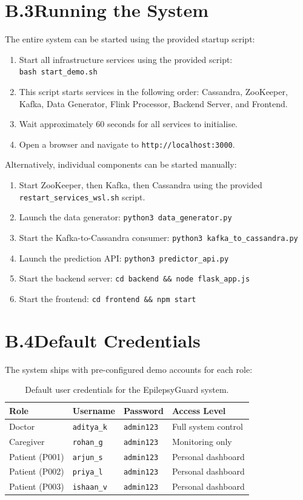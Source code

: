 \documentclass[12pt, a4paper, oneside]{report}
\begin{document}
\section*{B.3\quad Running the System}
The entire system can be started using the provided startup script:
\begin{enumerate}
    \item Start all infrastructure services using the provided script: \\
    \texttt{bash start\_demo.sh}
    \item This script starts services in the following order: Cassandra, ZooKeeper, Kafka, Data Generator, Flink Processor, Backend Server, and Frontend.
    \item Wait approximately 60 seconds for all services to initialise.
    \item Open a browser and navigate to \texttt{http://localhost:3000}.
\end{enumerate}

Alternatively, individual components can be started manually:
\begin{enumerate}
    \item Start ZooKeeper, then Kafka, then Cassandra using the provided \texttt{restart\_services\_wsl.sh} script.
    \item Launch the data generator: \texttt{python3 data\_generator.py}
    \item Start the Kafka-to-Cassandra consumer: \texttt{python3 kafka\_to\_cassandra.py}
    \item Launch the prediction API: \texttt{python3 predictor\_api.py}
    \item Start the backend server: \texttt{cd backend \&\& node flask\_app.js}
    \item Start the frontend: \texttt{cd frontend \&\& npm start}
\end{enumerate}

\section*{B.4\quad Default Credentials}
The system ships with pre-configured demo accounts for each role:

\begin{table}[h!]
\centering
\caption{Default user credentials for the EpilepsyGuard system.}
\small
\begin{tabular}{|l|l|l|l|}
\hline
\textbf{Role} & \textbf{Username} & \textbf{Password} & \textbf{Access Level} \\ \hline
Doctor & \texttt{aditya\_k} & \texttt{admin123} & Full system control \\ \hline
Caregiver & \texttt{rohan\_g} & \texttt{admin123} & Monitoring only \\ \hline
Patient (P001) & \texttt{arjun\_s} & \texttt{admin123} & Personal dashboard \\ \hline
Patient (P002) & \texttt{priya\_l} & \texttt{admin123} & Personal dashboard \\ \hline
Patient (P003) & \texttt{ishaan\_v} & \texttt{admin123} & Personal dashboard \\ \hline
\end{tabular}
\end{table}
\end{document}
